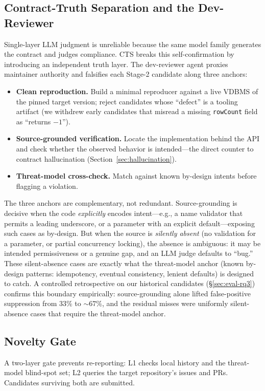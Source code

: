 \documentclass[sigconf, anonymous, review]{acmart}
\begin{document}
\subsection{Contract-Truth Separation and the Dev-Reviewer}\label{sec:cts}
Single-layer LLM judgment is unreliable because the same model family generates the contract and judges compliance. CTS breaks this self-confirmation by introducing an independent truth layer. The dev-reviewer agent proxies maintainer authority and falsifies each Stage-2 candidate along three anchors:
\begin{itemize}[leftmargin=*,itemsep=2pt]
\item \textbf{Clean reproduction.} Build a minimal reproducer against a live VDBMS of the pinned target version; reject candidates whose ``defect'' is a tooling artifact (we withdrew early candidates that misread a missing \texttt{rowCount} field as ``returns $-1$'').
\item \textbf{Source-grounded verification.} Locate the implementation behind the API and check whether the observed behavior is intended---the direct counter to contract hallucination (Section~\ref{sec:hallucination}).
\item \textbf{Threat-model cross-check.} Match against known by-design intents before flagging a violation.
\end{itemize}
The three anchors are complementary, not redundant. Source-grounding is decisive when the code \emph{explicitly} encodes intent---e.g., a name validator that permits a leading underscore, or a parameter with an explicit default---exposing such cases as by-design. But when the source is \emph{silently absent} (no validation for a parameter, or partial concurrency locking), the absence is ambiguous: it may be intended permissiveness or a genuine gap, and an LLM judge defaults to ``bug.'' These silent-absence cases are exactly what the threat-model anchor (known by-design patterns: idempotency, eventual consistency, lenient defaults) is designed to catch. A controlled retrospective on our historical candidates (\S\ref{sec:eval-rq3}) confirms this boundary empirically: source-grounding alone lifted false-positive suppression from 33\% to ${\sim}67\%$, and the residual misses were uniformly silent-absence cases that require the threat-model anchor.

\subsection{Novelty Gate}
A two-layer gate prevents re-reporting: L1 checks local history and the threat-model blind-spot set; L2 queries the target repository's issues and PRs. Candidates surviving both are submitted.
\end{document}
